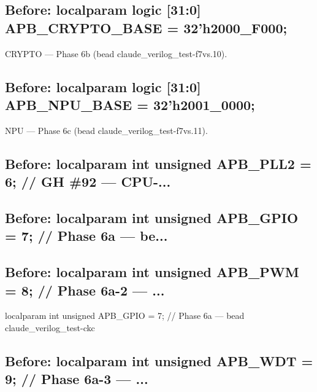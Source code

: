 \begin{record}
\subsection*{Before: localparam logic [31:0] APB\_CRYPTO\_BASE = 32'h2000\_F000;}

\begin{textblock}
CRYPTO — Phase 6b (bead claude_verilog_test-f7vs.10).
\end{textblock}

\subsection*{Before: localparam logic [31:0] APB\_NPU\_BASE    = 32'h2001\_0000;}

\begin{textblock}
NPU — Phase 6c (bead claude_verilog_test-f7vs.11).
\end{textblock}

\subsection*{Before: localparam int unsigned APB\_PLL2  = 6;  // GH \#92 — CPU-...}


\subsection*{Before: localparam int unsigned APB\_GPIO  = 7;  // Phase 6a — be...}


\subsection*{Before: localparam int unsigned APB\_PWM   = 8;  // Phase 6a-2 — ...}

\begin{textblock}
localparam int unsigned APB_GPIO  = 7;  // Phase 6a — bead claude_verilog_test-ckc
\end{textblock}

\subsection*{Before: localparam int unsigned APB\_WDT   = 9;  // Phase 6a-3 — ...}


\end{record}
